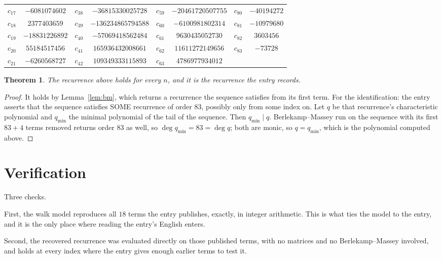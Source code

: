 \documentclass[11pt,a4paper]{article}
\theoremstyle{plain}
\newtheorem{theorem}{Theorem}
\theoremstyle{definition}
\begin{document}
\begin{center}
\begin{tabular}{cccccccc}
$c_{17}$ & $-6081074602$ & $c_{38}$ & $-36815330025728$ & $c_{59}$ & $-20461720507755$ & $c_{80}$ & $-40194272$ \\
$c_{18}$ & $2377403659$ & $c_{39}$ & $-136234865794588$ & $c_{60}$ & $-6100981802314$ & $c_{81}$ & $-10979680$ \\
$c_{19}$ & $-18831226892$ & $c_{40}$ & $-57069418562484$ & $c_{61}$ & $9630435052730$ & $c_{82}$ & $3603456$ \\
$c_{20}$ & $55184517456$ & $c_{41}$ & $165936432008661$ & $c_{62}$ & $11611272149656$ & $c_{83}$ & $-73728$ \\
$c_{21}$ & $-6260568727$ & $c_{42}$ & $109349333115893$ & $c_{63}$ & $4786977934012$ &  &  \\
\end{tabular}
\end{center}

\begin{theorem}
The recurrence above holds for every $n$, and it is the recurrence the entry records.
\end{theorem}

\begin{proof}
It holds by Lemma~\ref{lem:bm}, which returns a recurrence the sequence satisfies from its
first term. For the identification: the entry asserts that the sequence satisfies SOME
recurrence of order $83$, possibly only from some index on. Let $q$ be that recurrence's
characteristic polynomial and $q_{\min}$ the minimal polynomial of the tail of the sequence.
Then $q_{\min}\mid q$. Berlekamp--Massey run on the sequence with its first $83+4$ terms
removed returns order $83$ as well, so $\deg q_{\min}=83=\deg q$; both are monic, so
$q=q_{\min}$, which is the polynomial computed above.
\end{proof}

\section{Verification}

Three checks.

First, the walk model reproduces all $18$ terms the entry publishes, exactly, in integer
arithmetic. This is what ties the model to the entry, and it is the only place where reading
the entry's English enters.

Second, the recovered recurrence was evaluated directly on those published terms, with no
matrices and no Berlekamp--Massey involved, and holds at every index where the entry gives
enough earlier terms to test it.
\end{document}
